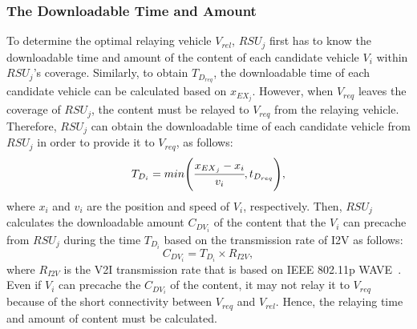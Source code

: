 \documentclass[electronics,aricle,accept,pdftex,moreauthors]{Definitions/mdpi}
\begin{document}
\subsubsection{The Downloadable Time and Amount} \label{sec3.2.1}
To determine the optimal relaying vehicle $V_{rel}$, $RSU_{j}$ first has to know the downloadable time and amount of the content of each candidate vehicle $V_{i}$ within $RSU_{j}$'s coverage.
Similarly, to obtain ${T}_{{D}_{req}}$, the downloadable time of each candidate vehicle can be calculated based on $x_{EX_{j}}$.
However, when $V_{req}$ leaves the coverage of $RSU_{j}$, the content must be relayed to $V_{req}$ from the relaying vehicle.
Therefore, $RSU_{j}$ can obtain the downloadable time of each candidate vehicle from $RSU_{j}$ in order to provide it to $V_{req}$, as follows:
\begin{equation}
     {T}_{{D}_{i}}=min \left( \cfrac{{x}_{{EX}_{j}}-{x}_{i}}{{v}_{i}}, t_{D_{req}} \right), %
\end{equation}
where ${x}_{i}$ and ${v}_{i}$ are the position and speed of ${V}_{i}$, respectively.
Then, $RSU_{j}$ calculates the downloadable amount $C_{DV_{i}}$ of the content that the $V_{i}$ can precache from $RSU_{j}$ during the time ${T}_{{D}_{i}}$ based on the transmission rate of I2V as follows:
\begin{equation}
     {C}_{{DV}_{i}}={T}_{{D}_{i}}\times{R}_{I2V}, %
\end{equation}
where ${R}_{I2V}$ is the V2I transmission rate that is based on IEEE 802.11p WAVE~\cite{wave2016}.
Even if $V_{i}$ can precache the $C_{DV_{i}}$ of the content, it may not relay it to $V_{req}$ because of the short connectivity between $V_{req}$ and $V_{rel}$.
Hence, the relaying time and amount of content must be calculated.
\end{document}
